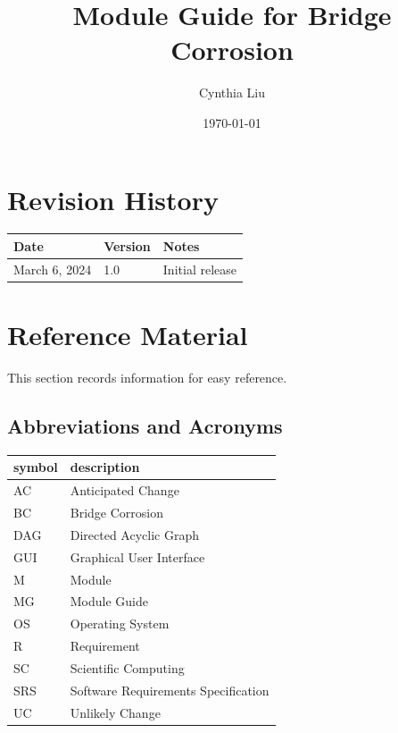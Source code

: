 \documentclass[12pt, titlepage]{article}
\begin{document}
\title{Module Guide for Bridge Corrosion} 
\author{Cynthia Liu}
\date{\today}

\maketitle


\section{Revision History}

\begin{tabularx}{\textwidth}{p{3cm}p{2cm}X}
\toprule {\bf Date} & {\bf Version} & {\bf Notes}\\
\midrule
March 6, 2024 & 1.0 & Initial release\\
\bottomrule
\end{tabularx}

\newpage

\section{Reference Material}

This section records information for easy reference.

\subsection{Abbreviations and Acronyms}

\renewcommand{\arraystretch}{1.2}
\begin{tabular}{l l} 
  \toprule		
  \textbf{symbol} & \textbf{description}\\
  \midrule 
  AC & Anticipated Change\\
  BC & Bridge Corrosion\\
  DAG & Directed Acyclic Graph \\
  GUI & Graphical User Interface \\
  M & Module \\
  MG & Module Guide \\
  OS & Operating System \\
  R & Requirement\\
  SC & Scientific Computing \\
  SRS & Software Requirements Specification\\
  UC & Unlikely Change \\
  \bottomrule
\end{tabular}\\
\end{document}
